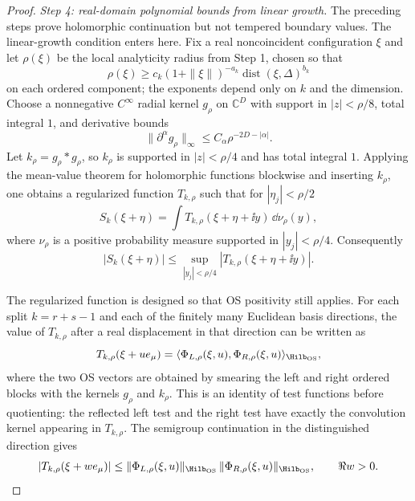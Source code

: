 \begin{proof}
\emph{Step 4: real-domain polynomial bounds from linear growth.}
The preceding steps prove holomorphic continuation but not tempered boundary
values.  The linear-growth condition enters here.  Fix a real noncoincident
configuration \(\xi\) and let \(\rho(\xi)\) be the local analyticity radius
from Step 1, chosen so that
\begin{equation}
  \rho(\xi)\ge c_k(1+\|\xi\|)^{-a_k}
  \operatorname{dist}(\xi,\Delta)^{b_k}
  \label{eq:os-local-radius-lower-bound}
\end{equation}
on each ordered component; the exponents depend only on \(k\) and the
dimension.  Choose a nonnegative \(C^\infty\) radial kernel \(g_\rho\) on
\(\mathbb C^D\) with support in \(|z|<\rho/8\), total integral \(1\), and
derivative bounds
\[
  \|\partial^\alpha g_\rho\|_\infty
  \le C_\alpha \rho^{-2D-|\alpha|}.
\]
Let \(k_\rho=g_\rho*g_\rho\), so \(k_\rho\) is supported in
\(|z|<\rho/4\) and has total integral \(1\).  Applying the mean-value theorem
for holomorphic functions blockwise and inserting \(k_\rho\), one obtains a
regularized function \(T_{k,\rho}\) such that for \(|\eta_j|<\rho/2\)
\begin{equation}
  S_k(\xi+\eta)
  =
  \int T_{k,\rho}(\xi+\eta+\ii y)\,\dd\nu_\rho(y),
  \label{eq:os-regularized-mean-value}
\end{equation}
where \(\nu_\rho\) is a positive probability measure supported in
\(|y_j|<\rho/4\).  Consequently
\begin{equation}
  |S_k(\xi+\eta)|
  \le
  \sup_{|y_j|<\rho/4}|T_{k,\rho}(\xi+\eta+\ii y)|.
  \label{eq:os-regularized-sup-bound}
\end{equation}

The regularized function is designed so that OS positivity still applies.  For
each split \(k=r+s-1\) and each of the finitely many Euclidean basis
directions, the value of \(T_{k,\rho}\) after a real displacement in that
direction can be written as
\begin{equation}
  T_{k,\rho}(\xi+u e_\mu)
  =
  \langle \Phi_{L,\rho}(\xi,u),\Phi_{R,\rho}(\xi,u)\rangle_{\Hilb_{\rm OS}},
  \label{eq:os-regularized-scalar-product}
\end{equation}
where the two OS vectors are obtained by smearing the left and right ordered
blocks with the kernels \(g_\rho\) and \(k_\rho\).  This is an identity of
test functions before quotienting: the reflected left test and the right test
have exactly the convolution kernel appearing in \(T_{k,\rho}\).  The
semigroup continuation in the distinguished direction gives
\begin{equation}
  |T_{k,\rho}(\xi+w e_\mu)|
  \le
  \|\Phi_{L,\rho}(\xi,u)\|_{\Hilb_{\rm OS}}\,
  \|\Phi_{R,\rho}(\xi,u)\|_{\Hilb_{\rm OS}},
  \qquad \Re w>0 .
  \label{eq:os-regularized-semigroup-bound}
\end{equation}


\end{proof}
